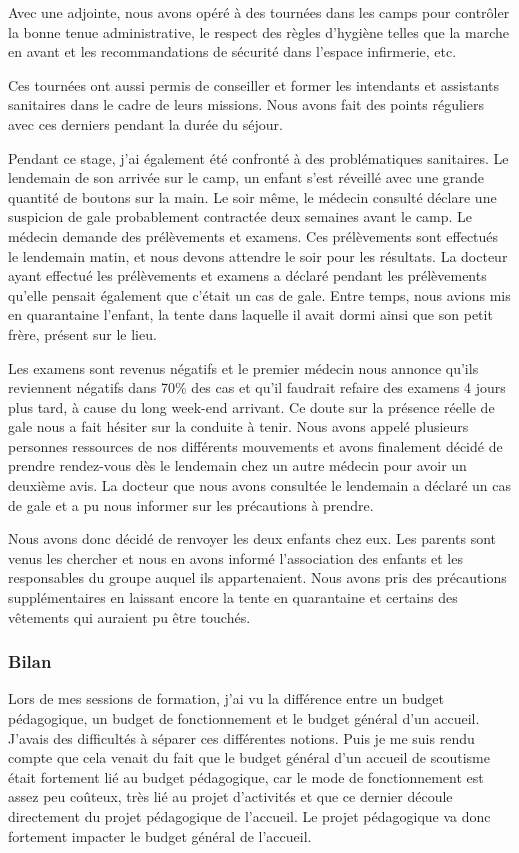 \documentclass[titlepage,11pt,a4paper]{article}
\begin{document}
Avec une adjointe, nous avons opéré à des tournées dans les camps pour contrôler la bonne
tenue administrative, le respect des règles d'hygiène telles que la marche en avant et les recommandations
de sécurité dans l'espace infirmerie, etc.

Ces tournées ont aussi permis de conseiller et former les intendants et assistants
sanitaires dans le cadre de leurs missions. Nous avons fait des points réguliers avec ces
derniers pendant la durée du séjour.

Pendant ce stage, j'ai également été confronté à des problématiques
sanitaires. Le lendemain de son arrivée sur le camp, un enfant s'est réveillé avec une
grande quantité de boutons sur la main. Le soir même, le médecin consulté déclare une
suspicion de gale probablement contractée deux semaines avant le camp. Le médecin demande
des prélèvements et examens. Ces prélèvements sont effectués
le lendemain matin, et nous devons attendre le soir pour les résultats. La docteur ayant
effectué les prélèvements et examens a déclaré pendant les prélèvements qu'elle pensait
également que c'était un cas de gale. Entre temps, nous avions mis en quarantaine
l'enfant, la tente dans laquelle il avait dormi ainsi que son petit frère, présent sur le
lieu.

Les examens sont revenus négatifs et le premier médecin nous annonce qu'ils reviennent
négatifs dans 70\% des cas et qu'il faudrait refaire des examens 4 jours plus tard, à cause du long
week-end arrivant. Ce doute sur la présence réelle de gale nous a fait hésiter sur la
conduite à tenir. Nous avons appelé plusieurs personnes ressources de nos différents
mouvements et avons finalement décidé de prendre rendez-vous dès le lendemain chez un
autre médecin pour avoir un deuxième avis. La docteur que nous avons consultée le
lendemain a déclaré un cas de gale et a pu nous informer sur les précautions à prendre.

Nous avons donc décidé de renvoyer les deux enfants chez eux. Les parents sont venus les
chercher et nous en avons informé l'association des enfants et les responsables du groupe
auquel ils appartenaient. Nous avons pris des précautions supplémentaires en laissant
encore la tente en quarantaine et certains des vêtements qui auraient pu être touchés.

\subsubsection{Bilan}

Lors de mes sessions de formation, j'ai vu la différence entre un budget pédagogique, un
budget de fonctionnement et le budget général d'un accueil. J'avais des difficultés à
séparer ces différentes notions. Puis je me suis rendu compte que cela venait du fait que le budget général d'un
accueil de scoutisme était fortement lié au budget pédagogique, car le mode de
fonctionnement est assez peu coûteux, très lié au projet d'activités et que ce dernier
découle directement du projet pédagogique de l'accueil. Le projet pédagogique
va donc fortement impacter le budget général de l'accueil.
\end{document}
